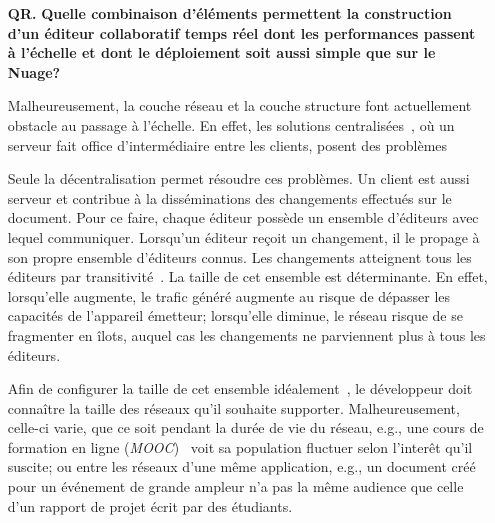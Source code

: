 \begin{itemize}
\item [\textbf{QR.}] \textbf{Quelle combinaison d'éléments permettent la
    construction d'un éditeur collaboratif temps réel dont les performances
    passent à l'échelle et dont le déploiement soit aussi simple que sur le
    Nuage?}
  
  Malheureusement, la couche réseau et la couche structure font actuellement
  obstacle au passage à l'échelle. En effet, les solutions
  centralisées~\cite{nichols1995high}, où un serveur fait office d'intermédiaire
  entre les clients, posent des problèmes
  Seule la décentralisation permet résoudre ces problèmes. Un client est aussi
  serveur et contribue à la disséminations des changements effectués sur le
  document. Pour ce faire, chaque éditeur possède un ensemble d'éditeurs avec
  lequel communiquer. Lorsqu'un éditeur reçoit un changement, il le propage à
  son propre ensemble d'éditeurs connus. Les changements atteignent tous les
  éditeurs par transitivité~\cite{birman1999bimodal}. La taille de cet ensemble
  est déterminante. En effet, lorsqu'elle augmente, le trafic généré augmente au
  risque de dépasser les capacités de l'appareil émetteur; lorsqu'elle diminue,
  le réseau risque de se fragmenter en îlots, auquel cas les changements ne
  parviennent plus à tous les éditeurs.

  Afin de configurer la taille de cet ensemble
  idéalement~\cite{erdos1959random}, le développeur doit connaître la taille des
  réseaux qu'il souhaite supporter. Malheureusement, celle-ci varie, que ce soit
  pendant la durée de vie du réseau, e.g., une cours de formation en ligne
  (\emph{MOOC})~\cite{breslow2013studying} voit sa population fluctuer selon
  l'interêt qu'il suscite; ou entre les réseaux d'une même application, e.g., un
  document créé pour un événement de grande ampleur n'a pas la même audience que
  celle d'un rapport de projet écrit par des étudiants.



\end{itemize}
